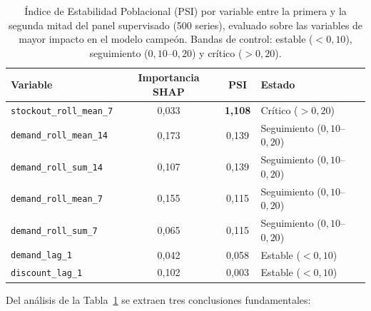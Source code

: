 \begin{table}[htbp]
    \centering
    \small
    \begin{tabular}{lccl}
        \toprule
        \textbf{Variable} & \textbf{Importancia SHAP} & \textbf{PSI} & \textbf{Estado} \\
        \midrule
        \texttt{stockout\_roll\_mean\_7} & 0{,}033 & \textbf{1{,}108} & Crítico ($>0{,}20$) \\
        \texttt{demand\_roll\_mean\_14} & 0{,}173 & 0{,}139 & Seguimiento ($0{,}10$--$0{,}20$) \\
        \texttt{demand\_roll\_sum\_14}  & 0{,}107 & 0{,}139 & Seguimiento ($0{,}10$--$0{,}20$) \\
        \texttt{demand\_roll\_mean\_7}  & 0{,}155 & 0{,}115 & Seguimiento ($0{,}10$--$0{,}20$) \\
        \texttt{demand\_roll\_sum\_7}   & 0{,}065 & 0{,}115 & Seguimiento ($0{,}10$--$0{,}20$) \\
        \texttt{demand\_lag\_1}         & 0{,}042 & 0{,}058 & Estable ($<0{,}10$) \\
        \texttt{discount\_lag\_1}       & 0{,}102 & 0{,}003 & Estable ($<0{,}10$) \\
        \bottomrule
    \end{tabular}
    \caption[PSI por variable entre mitades del panel]{Índice de Estabilidad Poblacional (PSI) por variable entre la primera y la segunda mitad del panel supervisado (500 series), evaluado sobre las variables de mayor impacto en el modelo campeón. Bandas de control: estable ($<0{,}10$), seguimiento ($0{,}10$--$0{,}20$) y crítico ($>0{,}20$).}
    \label{tab:psi_drift}
\end{table}

Del análisis de la Tabla~\ref{tab:psi_drift} se extraen tres conclusiones fundamentales:

